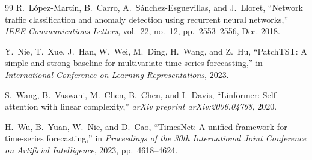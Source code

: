 \documentclass[12pt,a4paper]{article}
\theoremstyle{definition}
\begin{document}
\begin{thebibliography}{99}
R.~López-Martín, B.~Carro, A.~Sánchez-Esguevillas, and J.~Lloret, ``Network traffic classification and anomaly detection using recurrent neural networks,'' \emph{IEEE Communications Letters}, vol.~22, no.~12, pp.~2553--2556, Dec. 2018.

Y.~Nie, T.~Xue, J.~Han, W.~Wei, M.~Ding, H.~Wang, and Z.~Hu, ``PatchTST: A simple and strong baseline for multivariate time series forecasting,'' in \emph{International Conference on Learning Representations}, 2023.

S.~Wang, B.~Vaswani, M.~Chen, B.~Chen, and I.~Davis, ``Linformer: Self-attention with linear complexity,'' \emph{arXiv preprint arXiv:2006.04768}, 2020.

H.~Wu, B.~Yuan, W.~Nie, and D.~Cao, ``TimesNet: A unified framework for time-series forecasting,'' in \emph{Proceedings of the 30th International Joint Conference on Artificial Intelligence}, 2023, pp.~4618--4624.

\end{thebibliography}
\end{document}
